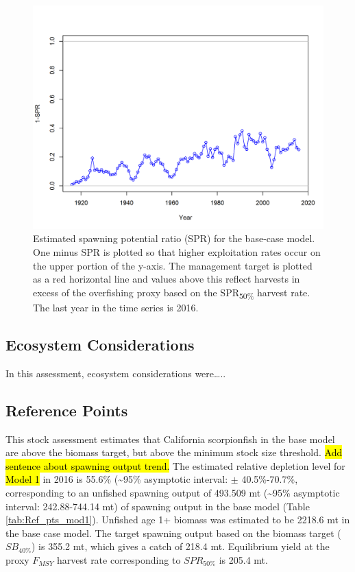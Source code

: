 \documentclass[12pt,]{article}
\begin{document}
\FloatBarrier

\begin{figure}[htbp]
\centering
\includegraphics{r4ss/plots_mod1/SPR2_minusSPRseries.png}
\caption{Estimated spawning potential ratio (SPR) for the base-case
model. One minus SPR is plotted so that higher exploitation rates occur
on the upper portion of the y-axis. The management target is plotted as
a red horizontal line and values above this reflect harvests in excess
of the overfishing proxy based on the SPR\textsubscript{50\%} harvest
rate. The last year in the time series is 2016. \label{fig:SPR_all}}
\end{figure}

\FloatBarrier

\subsection*{Ecosystem Considerations}\label{ecosystem-considerations}

In this assessment, ecosystem considerations were\ldots{}..

\subsection*{Reference Points}\label{reference-points}

This stock assessment estimates that California scorpionfish in the base
model are above the biomass target, but above the minimum stock size
threshold. \hl{Add sentence about spawning output trend.} The estimated
relative depletion level for \hl{Model 1} in 2016 is 55.6\%
(\textasciitilde{}95\% asymptotic interval: \(\pm\) 40.5\%-70.7\%,
corresponding to an unfished spawning output of 493.509 mt
(\textasciitilde{}95\% asymptotic interval: 242.88-744.14 mt) of
spawning output in the base model (Table \ref{tab:Ref_pts_mod1}).
Unfished age 1+ biomass was estimated to be 2218.6 mt in the base case
model. The target spawning output based on the biomass target
(\(SB_{40\%}\)) is 355.2 mt, which gives a catch of 218.4 mt.
Equilibrium yield at the proxy \(F_{MSY}\) harvest rate corresponding to
\(SPR_{50\%}\) is 205.4 mt.
\end{document}

